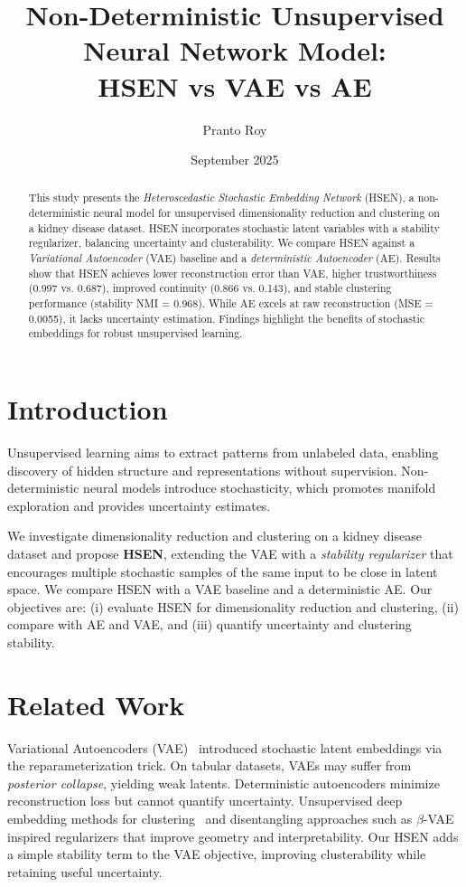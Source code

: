 \documentclass[12pt,a4paper]{article}
\title{Non-Deterministic Unsupervised Neural Network Model:\\ HSEN vs VAE vs AE}
\author{Pranto Roy}
\date{September 2025}
\begin{document}
\maketitle

\begin{abstract}
\justifying
This study presents the \textit{Heteroscedastic Stochastic Embedding Network} (HSEN), a non-deterministic neural model for unsupervised dimensionality reduction and clustering on a kidney disease dataset. HSEN incorporates stochastic latent variables with a stability regularizer, balancing uncertainty and clusterability. We compare HSEN against a \textit{Variational Autoencoder} (VAE) baseline and a \textit{deterministic Autoencoder} (AE). Results show that HSEN achieves lower reconstruction error than VAE, higher trustworthiness (\num{0.997} vs. \num{0.687}), improved continuity (\num{0.866} vs. \num{0.143}), and stable clustering performance (stability NMI = \num{0.968}). While AE excels at raw reconstruction (MSE = \num{0.0055}), it lacks uncertainty estimation. Findings highlight the benefits of stochastic embeddings for robust unsupervised learning.
\end{abstract}

\section{Introduction}
Unsupervised learning aims to extract patterns from unlabeled data, enabling discovery of hidden structure and representations without supervision. Non-deterministic neural models introduce stochasticity, which promotes manifold exploration and provides uncertainty estimates.

We investigate dimensionality reduction and clustering on a kidney disease dataset and propose \textbf{HSEN}, extending the VAE with a \emph{stability regularizer} that encourages multiple stochastic samples of the same input to be close in latent space. We compare HSEN with a VAE baseline and a deterministic AE. Our objectives are: (i) evaluate HSEN for dimensionality reduction and clustering, (ii) compare with AE and VAE, and (iii) quantify uncertainty and clustering stability.

\section{Related Work}
Variational Autoencoders (VAE)~\cite{kingma2013auto} introduced stochastic latent embeddings via the reparameterization trick. On tabular datasets, VAEs may suffer from \emph{posterior collapse}, yielding weak latents. Deterministic autoencoders minimize reconstruction loss but cannot quantify uncertainty. Unsupervised deep embedding methods for clustering~\cite{xie2016unsupervised} and disentangling approaches such as $\beta$-VAE~\cite{higgins2016beta} inspired regularizers that improve geometry and interpretability. Our HSEN adds a simple stability term to the VAE objective, improving clusterability while retaining useful uncertainty.
\end{document}
